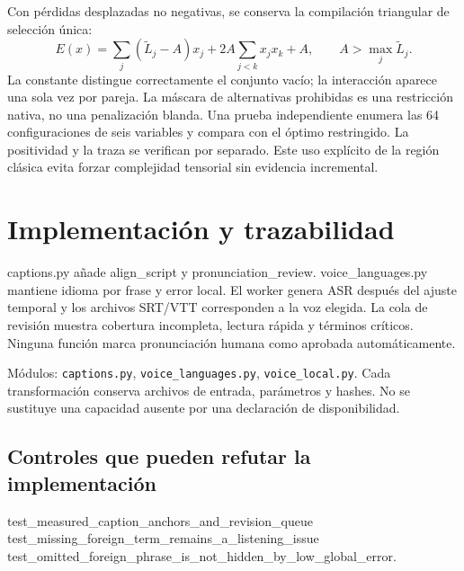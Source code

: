 \documentclass[10pt,a4paper]{article}
\begin{document}
Con pérdidas desplazadas no negativas, se conserva la compilación triangular de selección única:
\begin{equation}
E(x)=\sum_j(\widetilde L_j-A)x_j+2A\sum_{j<k}x_jx_k+A,\qquad A>\max_j\widetilde L_j.
\end{equation}
La constante distingue correctamente el conjunto vacío; la interacción aparece una sola vez por pareja. La máscara de alternativas prohibidas es una restricción nativa, no una penalización blanda. Una prueba independiente enumera las 64 configuraciones de seis variables y compara con el óptimo restringido. La positividad y la traza se verifican por separado. Este uso explícito de la región clásica evita forzar complejidad tensorial sin evidencia incremental.
\section{Implementación y trazabilidad}
captions.py añade align\_\allowbreak{}script y pronunciation\_\allowbreak{}review. voice\_\allowbreak{}languages.py mantiene idioma por frase y error local. El worker genera ASR después del ajuste temporal y los archivos SRT/VTT corresponden a la voz elegida. La cola de revisión muestra cobertura incompleta, lectura rápida y términos críticos. Ninguna función marca pronunciación humana como aprobada automáticamente.

Módulos: \texttt{captions.py}, \texttt{voice\_\allowbreak{}languages.py}, \texttt{voice\_\allowbreak{}local.py}. Cada transformación conserva archivos de entrada, parámetros y hashes. No se sustituye una capacidad ausente por una declaración de disponibilidad.
\subsection{Controles que pueden refutar la implementación}
\begin{flushleft}\small test\_\allowbreak{}measured\_\allowbreak{}caption\_\allowbreak{}anchors\_\allowbreak{}and\_\allowbreak{}revision\_\allowbreak{}queue\\ test\_\allowbreak{}missing\_\allowbreak{}foreign\_\allowbreak{}term\_\allowbreak{}remains\_\allowbreak{}a\_\allowbreak{}listening\_\allowbreak{}issue\\ test\_\allowbreak{}omitted\_\allowbreak{}foreign\_\allowbreak{}phrase\_\allowbreak{}is\_\allowbreak{}not\_\allowbreak{}hidden\_\allowbreak{}by\_\allowbreak{}low\_\allowbreak{}global\_\allowbreak{}error.\end{flushleft}
\end{document}
